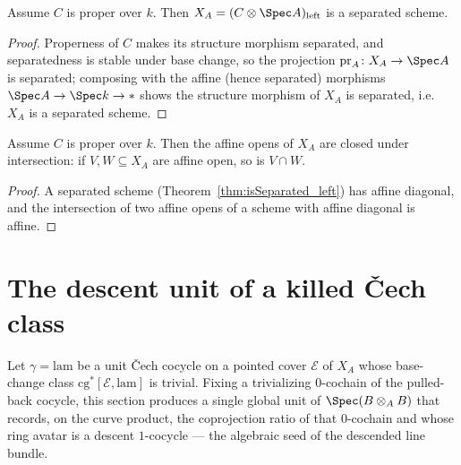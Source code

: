 \begin{theorem}
  \label{thm:isSeparated_left}
  \leanok
  Assume \(C\) is proper over \(k\). Then \(X_A = (C \otimes \Spec A)_{\mathrm{left}}\) is a
  separated scheme.
\end{theorem}
\begin{proof}
  \leanok
  Properness of \(C\) makes its structure morphism separated, and separatedness is stable under
  base change, so the projection \(\mathrm{pr}_A \colon X_A \to \Spec A\) is separated; composing
  with the affine (hence separated) morphisms \(\Spec A \to \Spec k \to \ast\) shows the structure
  morphism of \(X_A\) is separated, i.e.\ \(X_A\) is a separated scheme.
\end{proof}

\begin{theorem}
  \label{thm:isAffineOpen_inf}
  \leanok
  Assume \(C\) is proper over \(k\). Then the affine opens of \(X_A\) are closed under
  intersection: if \(V, W \subseteq X_A\) are affine open, so is \(V \cap W\).
\end{theorem}
\begin{proof}
  \leanok
  A separated scheme (Theorem~\ref{thm:isSeparated_left}) has affine diagonal, and the
  intersection of two affine opens of a scheme with affine diagonal is affine.
\end{proof}

\section{The descent unit of a killed \v Cech class}
\label{sec:kernelDescentUnit}

Let \(\gamma = \mathrm{lam}\) be a unit \v Cech cocycle on a pointed cover \(\mathcal E\) of
\(X_A\) whose base-change class \(\mathrm{cg}^{*}[\mathcal E, \mathrm{lam}]\) is trivial. Fixing
a trivializing \(0\)-cochain of the pulled-back cocycle, this section produces a single global
unit of \(\Spec(B \otimes_A B)\) that records, on the curve product, the coprojection ratio of
that \(0\)-cochain and whose ring avatar is a descent \(1\)-cocycle — the algebraic seed of the
descended line bundle.

